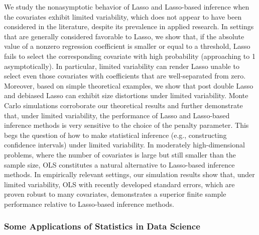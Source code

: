 \begin{itemize}
We study the nonasymptotic behavior of Lasso and Lasso-based inference when the covariates exhibit limited variability, which does not appear to have been considered in the literature, despite its prevalence in applied research. In settings that are generally considered favorable to Lasso, we show that, if the absolute value of a nonzero regression coefficient is smaller or equal to a threshold, Lasso fails to select the corresponding covariate with high probability (approaching to 1 asymptotically). In particular, limited variability can render Lasso unable to select even those covariates with coefficients that are well-separated from zero. Moreover, based on simple theoretical examples, we show that post double Lasso and debiased Lasso can exhibit size distortions under limited variability. Monte Carlo simulations corroborate our theoretical results and further demonstrate that, under limited variability, the performance of Lasso and Lasso-based inference methods is very sensitive to the choice of the penalty parameter. This begs the question of how to make statistical inference (e.g., constructing confidence intervals) under limited variability. In moderately high-dimensional problems, where the number of covariates is large but still smaller than the sample size, OLS constitutes a natural alternative to Lasso-based inference methods. In empirically relevant settings, our simulation results show that, under limited variability, OLS with recently developed standard errors, which are proven robust to many covariates, demonstrates a superior finite sample performance relative to Lasso-based inference methods.

\end{itemize}

\subsubsection*{Some Applications of Statistics in Data Science}

